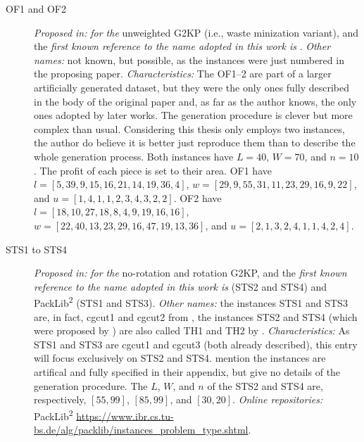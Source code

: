 \documentclass[ppgc,tese,english,formais,babel]{iiufrgs}
\begin{document}
\begin{description}
\item [OF1 and OF2] \emph{Proposed in:} \citet{oliveira:1990} \emph{for the} unweighted G2KP (i.e., waste minization variant), and the \emph{first known reference to the name adopted in this work is} \citet{hifi:2001}. \emph{Other names:} not known, but possible, as the instances were just numbered in the proposing paper. \emph{Characteristics: } The OF1--2 are part of a larger artificially generated dataset, but they were the only ones fully described in the body of the original paper and, as far as the author knows, the only ones adopted by later works. The generation procedure is clever but more complex than usual. Considering this thesis only employs two instances, the author do believe it is better just reproduce them than to describe the whole generation process. Both instances have \(L = 40\), \(W = 70\), and \(n = 10\). The profit of each piece is set to their area. OF1 have \(l = [5, 39, 9, 15, 16, 21, 14, 19, 36, 4]\), \(w = [29, 9, 55, 31, 11, 23, 29, 16, 9, 22]\), and \(u = [1, 4, 1, 1, 2, 3, 4, 3, 2, 2]\). OF2 have \(l = [18, 10, 27, 18, 8, 4, 9, 19, 16, 16]\), \(w = [22, 40, 13, 23, 29, 16, 47, 19, 13, 36]\), and \(u = [2, 1, 3, 2, 4, 1, 1, 4, 2, 4]\).
\item [STS1 to STS4] \emph{Proposed in:} \citet{tschoke:1995} \emph{for the} no-rotation and rotation G2KP, and the \emph{first known reference to the name adopted in this work is} \citet{alvarez:2002:tabu} (STS2 and STS4) and PackLib\textsuperscript{2} (STS1 and STS3). \emph{Other names:} the instances STS1 and STS3 are, in fact, cgcut1 and cgcut2 from \citet{cw:1977}, the instances STS2 and STS4 (which were proposed by \citet{tschoke:1995}) are also called TH1 and TH2 by \citet{fayard:1998}. \emph{Characteristics: } As STS1 and STS3 are cgcut1 and cgcut3 (both already described), this entry will focus exclusively on STS2 and STS4. \citet{tschoke:1995} mention the instances are artifical and fully specified in their appendix, but give no details of the generation procedure. The \(L\), \(W\), and \(n\) of the STS2 and STS4 are, respectively, \([55, 99]\), \([85, 99]\), and \([30, 20]\). \emph{Online repositories:} PackLib\textsuperscript{2} \url{https://www.ibr.cs.tu-bs.de/alg/packlib/instances_problem_type.shtml}.

\end{description}
\end{document}
